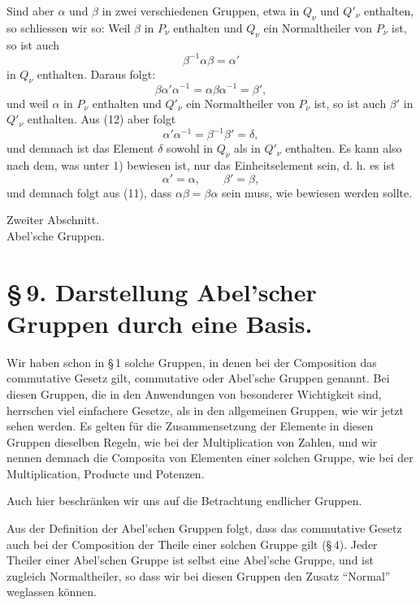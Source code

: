 \documentclass[11pt]{article}
\begin{document}
Sind aber $\alpha$ und $\beta$ in zwei verschiedenen Gruppen, etwa in $Q_\nu$ und $Q'_\nu$ enthalten, so schliessen wir so: Weil $\beta$ in $P_\nu$ enthalten und $Q_\nu$ ein Normaltheiler von $P_\nu$ ist, so ist auch
\begin{equation}
\beta^{-1}\alpha\beta=\alpha'
\tag{11}
\end{equation}
in $Q_\nu$ enthalten. Daraus folgt:
\begin{equation}
\beta\alpha'\alpha^{-1}=\alpha\beta\alpha^{-1}=\beta',
\tag{12}
\end{equation}
und weil $\alpha$ in $P_\nu$ enthalten und $Q'_\nu$ ein Normaltheiler von $P_\nu$ ist, so ist auch $\beta'$ in $Q'_\nu$ enthalten. Aus (12) aber folgt
\[
\alpha'\alpha^{-1}=\beta^{-1}\beta'=\delta,
\]
und demnach ist das Element $\delta$ sowohl in $Q_\nu$ als in $Q'_\nu$ enthalten. Es kann also nach dem, was unter 1) bewiesen ist, nur das Einheitselement sein, d. h. es ist
\[
\alpha'=\alpha,
\qquad
\beta'=\beta,
\]
und demnach folgt aus (11), dass $\alpha\beta=\beta\alpha$ sein muss, wie bewiesen werden sollte.

\clearpage

\begin{center}
{\large Zweiter Abschnitt.}\\[0.35em]
{\Large Abel'sche Gruppen.}
\end{center}

\section*{\S\,9. Darstellung Abel'scher Gruppen durch eine Basis.}

Wir haben schon in \S\,1 solche Gruppen, in denen bei der Composition das commutative Gesetz gilt, commutative oder Abel'sche Gruppen genannt. Bei diesen Gruppen, die in den Anwendungen von besonderer Wichtigkeit sind, herrschen viel einfachere Gesetze, als in den allgemeinen Gruppen, wie wir jetzt sehen werden. Es gelten für die Zusammensetzung der Elemente in diesen Gruppen dieselben Regeln, wie bei der Multiplication von Zahlen, und wir nennen demnach die Composita von Elementen einer solchen Gruppe, wie bei der Multiplication, Producte und Potenzen.

Auch hier beschränken wir uns auf die Betrachtung endlicher Gruppen.

Aus der Definition der Abel'schen Gruppen folgt, dass das commutative Gesetz auch bei der Composition der Theile einer solchen Gruppe gilt (\S\,4). Jeder Theiler einer Abel'schen Gruppe ist selbst eine Abel'sche Gruppe, und ist zugleich Normaltheiler, so dass wir bei diesen Gruppen den Zusatz ``Normal'' weglassen können.
\end{document}
